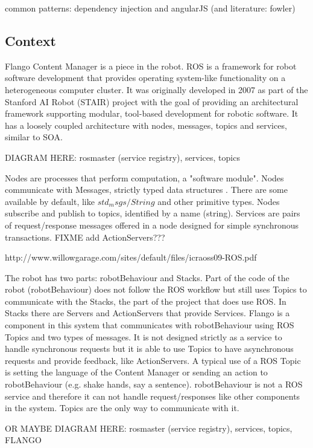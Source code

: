 common patterns:
dependency injection and angularJS (and literature: fowler)

\subsection{Context}
Flango Content Manager is a piece in the robot.
\ac{ROS} is a framework for robot software development that provides operating system-like functionality on a heterogeneous computer cluster. 
It was originally developed in 2007 as part of the Stanford AI Robot (STAIR) project with the goal of providing an architectural framework supporting modular, tool-based development for robotic software.
It has a loosely coupled architecture with nodes, messages, topics and services, similar to \ac{SOA}.

DIAGRAM HERE: rosmaster (service registry), services, topics

Nodes are processes that perform computation, a "software module". 
Nodes communicate with Messages, strictly typed data structures . There are some available by default, like $std_msgs/String$ and other primitive types.
Nodes subscribe and publish to topics, identified by a name (string).
Services are pairs of request/response messages offered in a node designed for simple synchronous transactions.
FIXME add ActionServers???


http://www.willowgarage.com/sites/default/files/icraoss09-ROS.pdf

The robot has two parts: robotBehaviour and Stacks.
Part of the code of the robot (robotBehaviour) does not follow the \ac{ROS} workflow but still uses Topics to communicate with the Stacks, the part of the project that does use \ac{ROS}.
In Stacks there are Servers and ActionServers that provide Services.
Flango is a component in this system that communicates with robotBehaviour using \ac{ROS} Topics and two types of messages.
It is not designed strictly as a service to handle synchronous requests but it is able to use Topics to have asynchronous requests and provide feedback, like ActionServers.
A typical use of a \ac{ROS} Topic is setting the language of the Content Manager or sending an action to robotBehaviour (e.g. shake hands, say a sentence).
robotBehaviour is not a \ac{ROS} service and therefore it can not handle request/responses like other components in the system.
Topics are the only way to communicate with it.

OR MAYBE DIAGRAM HERE: rosmaster (service registry), services, topics, FLANGO

